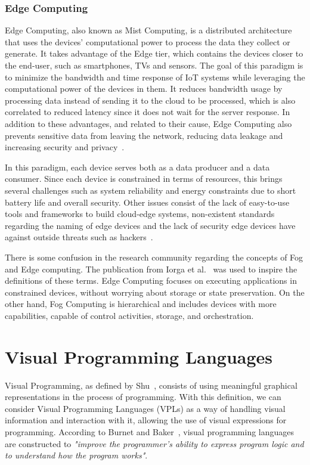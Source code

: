 \subsubsection{Edge Computing}\label{sec:edge_computing}

Edge Computing, also known as Mist Computing, is a distributed architecture that uses the devices' computational power to process the data they collect or generate. It takes advantage of the Edge tier, which contains the devices closer to the end-user, such as smartphones, TVs and sensors. The goal of this paradigm is to minimize the bandwidth and time response of IoT systems while leveraging the computational power of the devices in them. It reduces bandwidth usage by processing data instead of sending it to the cloud to be processed, which is also correlated to reduced latency since it does not wait for the server response. In addition to these advantages, and related to their cause, Edge Computing also prevents sensitive data from leaving the network, reducing data leakage and increasing security and privacy~\cite{edge_computing, edge_computing_2019}.

In this paradigm, each device serves both as a data producer and a data consumer. Since each device is constrained in terms of resources, this brings several challenges such as system reliability and energy constraints due to short battery life and overall security. Other issues consist of the lack of easy-to-use tools and frameworks to build cloud-edge systems, non-existent standards regarding the naming of edge devices and the lack of security edge devices have against outside threats such as hackers~\cite{promise_of_edge_computing}.

There is some confusion in the research community regarding the concepts of Fog and Edge computing. The publication from Iorga et al.~\cite{fog_edge_differences} was used to inspire the definitions of these terms. Edge Computing focuses on executing applications in constrained devices, without worrying about storage or state preservation. On the other hand, Fog Computing is hierarchical and includes devices with more capabilities, capable of control activities, storage, and orchestration.

\section{Visual Programming Languages}\label{sec:background_vpl}

Visual Programming, as defined by Shu~\cite{vpl_definition_shu}, consists of using meaningful graphical representations in the process of programming. With this definition, we can consider Visual Programming Languages (VPLs) as a way of handling visual information and interaction with it, allowing the use of visual expressions for programming. According to Burnet and Baker~\cite{scaling_vpls}, visual programming languages are constructed to \emph{ "improve the programmer's ability to express program logic and to understand how the program works"}.

